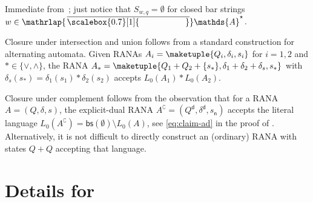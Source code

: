 \documentclass[10pt,a4paper]{amsart}
\theoremstyle{definition}
\newcommand{\At}{\mathds{A}}
\newcommand{\barAs}{\barNames^{\star}}
\newcommand{\bars}{\mathsf{bs}}
\newcommand{\negsym}{\mathsf{n}}
\newcommand{\negstate}[1]{#1_{\negsym}}
\newcommand{\dual}[1]{{#1}^\mathsf{d}}
\newcommand{\names}{\At}
\newcommand{\set}[1]{\{#1\}}
\newcommand{\mybar}[3]{%
  \mathrlap{\hspace{#2}\overline{\scalebox{#1}[1]{\phantom{\ensuremath{#3}}}}}\ensuremath{#3}
}
\newcommand{\barNames}{{\mybar{0.7}{1.25pt}{\names}}}
\begin{document}
\begin{IEEEproof}
Immediate from~; just notice that $S_{w,q}=\emptyset$ for closed bar strings $w\in \barAs$. 
\end{IEEEproof}

\begin{IEEEproof}
  Closure under intersection and union follows from a standard construction for alternating automata. Given RANAs $A_i = \maketuple{Q_i, \delta_i, s_i}$
  for $i = 1, 2$ and $\ast\in\set{\vee,\wedge}$, the RANA $A_{\ast} = \maketuple{Q_1 + Q_2 + \set{s_\ast},
  \delta_1 + \delta_2 + \delta_s, s_\ast}$ 
  with $\delta_s(s_\ast) = \delta_1(s_1) \ast \delta_2(s_2)$ accepts $L_0(A_1) \ast L_0(A_2)$.

Closure under complement follows from the observation that for a RANA $A=(Q,\delta,s)$, the explicit-dual RANA $A^\complement=(\dual{Q},\dual{\delta},\negstate{s})$ accepts the literal language $L_0(A^\complement)=\bars(\emptyset)\setminus L_0(A)$, see \eqref{eq:claim-ad} in the proof of . Alternatively, it is not difficult to directly construct an (ordinary) RANA with states $Q+Q$ accepting that language.
\end{IEEEproof}


\section{Details for~\label{app:secLOG}}
\end{document}
